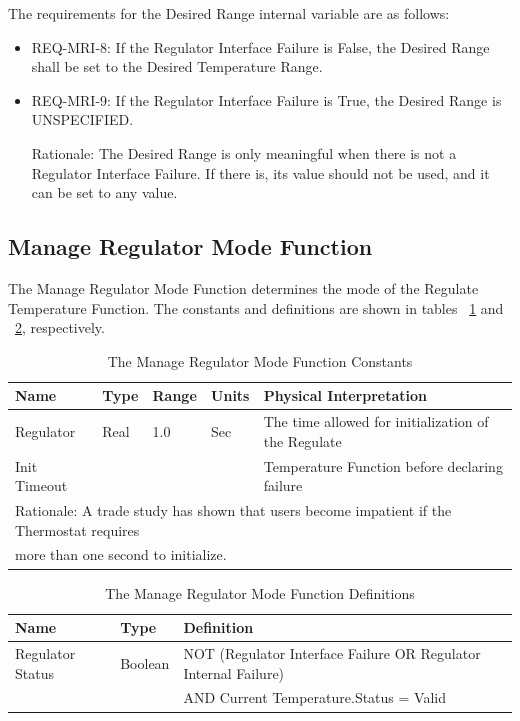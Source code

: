 The requirements for the Desired Range internal variable are as follows:

\begin{itemize}
\item REQ-MRI-8: If the Regulator Interface Failure is False, the Desired Range shall be set to
      the Desired Temperature Range.
\item REQ-MRI-9: If the Regulator Interface Failure is True, the Desired Range is UNSPECIFIED.

      Rationale: The Desired Range is only meaningful when there is not a Regulator Interface
      Failure. If there is, its value should not be used, and it can be set to any value.
\end{itemize}

\subsection{Manage Regulator Mode Function}
\label{subsec:MRM-fun}

The Manage Regulator Mode Function determines the mode of the Regulate Temperature
Function. The constants and definitions are shown in tables ~\ref{tab:MRM-fun-constants} and ~\ref{tab:MRM-fun-definitions}, respectively.

\begin{table}
\begin{tabular}{|l|l|l|l|l|}
\hline
Name & Type & Range & Units & Physical Interpretation \\\hline
Regulator & Real & 1.0 & Sec & The time allowed for initialization of the Regulate \\
Init Timeout &  &  &  & Temperature Function before declaring failure \\\hline
\multicolumn{5}{|l|}{Rationale: A trade study has shown that users become impatient if the Thermostat requires} \\
\multicolumn{5}{|l|}{more than one second to initialize.} \\\hline
\end{tabular}
\caption{The Manage Regulator Mode Function Constants}
\label{tab:MRM-fun-constants}
\end{table}

\begin{table}
\begin{tabular}{|l|l|l|}
\hline
Name & Type & Definition \\\hline
Regulator Status & Boolean & NOT (Regulator Interface Failure OR Regulator Internal Failure) \\
  &  & AND Current Temperature.Status = Valid \\\hline
\end{tabular}
\caption{The Manage Regulator Mode Function Definitions}
\label{tab:MRM-fun-definitions}
\end{table}

